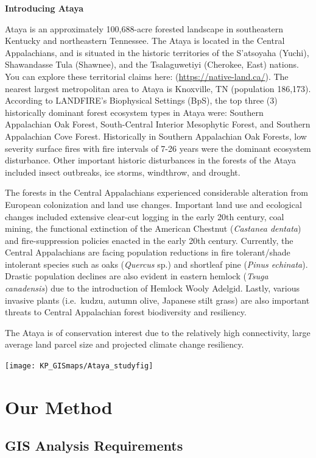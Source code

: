 \documentclass[
]{book}
\begin{document}
\textbf{Introducing Ataya}

Ataya is an approximately 100,688-acre forested landscape in southeastern Kentucky and northeastern Tennessee. The Ataya is located in the Central Appalachians, and is situated in the historic territories of the S'atsoyaha (Yuchi), Shawandasse Tula (Shawnee), and the Tsalaguwetiyi (Cherokee, East) nations. You can explore these territorial claims here: (\url{https://native-land.ca/}). The nearest largest metropolitan area to Ataya is Knoxville, TN (population 186,173). According to LANDFIRE's Biophysical Settings (BpS), the top three (3) historically dominant forest ecosystem types in Ataya were: Southern Appalachian Oak Forest, South-Central Interior Mesophytic Forest, and Southern Appalachian Cove Forest. Historically in Southern Appalachian Oak Forests, low severity surface fires with fire intervals of 7-26 years were the dominant ecosystem disturbance. Other important historic disturbances in the forests of the Ataya included insect outbreaks, ice storms, windthrow, and drought.

The forests in the Central Appalachians experienced considerable alteration from European colonization and land use changes. Important land use and ecological changes included extensive clear-cut logging in the early 20th century, coal mining, the functional extinction of the American Chestnut (\emph{Castanea dentata}) and fire-suppression policies enacted in the early 20th century. Currently, the Central Appalachians are facing population reductions in fire tolerant/shade intolerant species such as oaks (\emph{Quercus} sp.) and shortleaf pine (\emph{Pinus echinata}). Drastic population declines are also evident in eastern hemlock (\emph{Tsuga canadensis}) due to the introduction of Hemlock Wooly Adelgid. Lastly, various invasive plants (i.e.~kudzu, autumn olive, Japanese stilt grass) are also important threats to Central Appalachian forest biodiversity and resiliency.

The Ataya is of conservation interest due to the relatively high connectivity, large average land parcel size and projected climate change resiliency.

\texttt{[image: KP\_GISmaps/Ataya\_studyfig]}

\hypertarget{ourmethods}{%
\chapter{Our Method}\label{ourmethods}}

\hypertarget{gis-analysis-requirements}{%
\section{GIS Analysis Requirements}\label{gis-analysis-requirements}}
\end{document}
